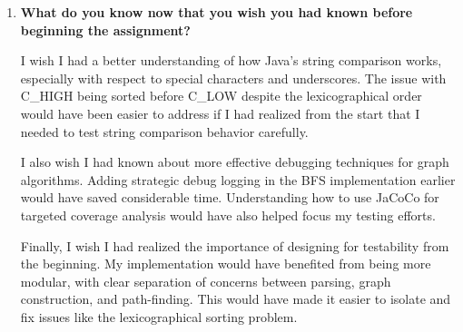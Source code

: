 \documentclass[11pt]{article}
\begin{document}
\begin{enumerate}
    \item \textbf{What do you know now that you wish you had known before beginning the assignment?}
    
    I wish I had a better understanding of how Java's string comparison works, especially with respect to special characters and underscores. The issue with C\_HIGH being sorted before C\_LOW despite the lexicographical order would have been easier to address if I had realized from the start that I needed to test string comparison behavior carefully.
    
    I also wish I had known about more effective debugging techniques for graph algorithms. Adding strategic debug logging in the BFS implementation earlier would have saved considerable time. Understanding how to use JaCoCo for targeted coverage analysis would have also helped focus my testing efforts.
    
    Finally, I wish I had realized the importance of designing for testability from the beginning. My implementation would have benefited from being more modular, with clear separation of concerns between parsing, graph construction, and path-finding. This would have made it easier to isolate and fix issues like the lexicographical sorting problem.
    
\end{enumerate}
\end{document}
